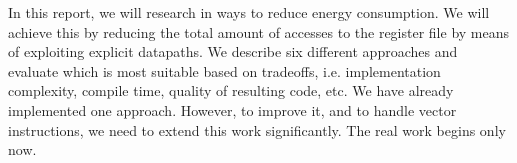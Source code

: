 
In this report, we will research in ways to reduce energy consumption. We will achieve this by reducing the total amount of accesses to the register file by means of exploiting explicit datapaths. We describe six different approaches and evaluate which is most suitable based on tradeoffs, i.e. implementation complexity, compile time, quality of resulting code, etc. We have already implemented one approach. However, to improve it, and to handle vector instructions, we need to extend this work significantly. The real work begins only now. 

\vspace{10mm}
 \keywords